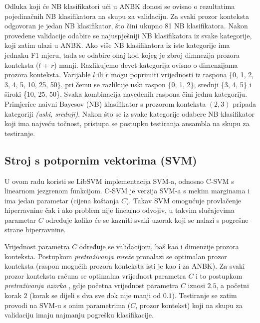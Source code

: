 \documentclass[10pt, a4paper]{article}
\begin{document}
Odluka koji će NB klasifikatori ući u ANBK donosi se ovisno o rezultatima pojedinačnih
NB klasifikatora na skupu za validaciju.
Za svaki prozor konteksta odgovoran je jedan
NB klasifikator, što čini ukupno 81 NB klasifikatora. 
Nakon provedene validacije odabire se najuspješniji NB klasifikatora
iz svake kategorije, koji zatim ulazi u ANBK. Ako više NB klasifikatora iz
iste kategorije ima jednaku F1 mjeru, tada se odabire onaj kod kojeg
je zbroj dimnezija prozora konteksta ($l$ + $r$) manji.
Razlikujemo devet kategorija ovisno o dimenzijama prozora konteksta.
Varijable $l$ ili $r$ mogu poprimiti vrijednosti iz raspona \{0, 1, 2, 3, 4, 5, 10, 25, 50\},
pri čemu se razlikuje uski raspon \{0, 1, 2\}, srednji \{3, 4, 5\} i široki \{10, 25, 50\}.
Svaka kombinacija navedenih raspona čini jednu kategoriju. Primjerice
naivni Bayesov (NB) klasifikator s prozorom konteksta $(2,3)$ pripada kategoriji \emph{(uski, srednji)}.
Nakon što se iz svake kategorije odabere NB klasifikator koji ima najveću točnost,
pristupa se postupku testiranja ansambla na skupu za testiranje.

\subsection{Stroj s potpornim vektorima (SVM)}
U ovom radu koristi se LibSVM implementacija \mbox{SVM-a}, odnosno C-SVM s linearnom
jezgrenom funkcijom. 
\mbox{C-SVM} je verzija SVM-a s mekim marginama i ima jedan parametar (cijena koštanja $C$).
Takav SVM omogućuje provlačenje hiperravnine čak i ako problem
nije linearno odvojiv, u takvim slučajevima parametar $C$ određuje koliko će
se kazniti svaki uzorak koji se nalazi s pogrešne strane hiperravnine.

Vrijednost parametra $C$ određuje se validacijom, baš kao
i dimenzije prozora konteksta.
Postupkom \emph{pretraživanja mreže}  pronalazi se
optimalan prozor konteksta (raspon mogućih prozora konteksta
isti je kao i za ANBK). Za svaki prozor konteksta računa se
optimalna vrijednost parametra $C$ i to postupkom \emph{pretraživanja uzorka} ,
gdje početna vrijednost parametra $C$ iznosi $2.5$, a početni korak $2$ (korak se dijeli s dva sve dok nije manji od $0.1$). Testiranje se zatim
provodi na SVM-u s onim parametrima ($C$, prozor kontekst)
koji na skupu za validaciju imaju najmanju pogrešku klasifikacije.
\end{document}

